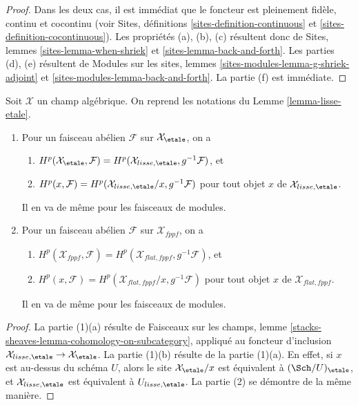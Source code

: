 \begin{proof}
Dans les deux cas, il est immédiat que le foncteur est pleinement fidèle,
continu et cocontinu (voir
Sites, définitions \ref{sites-definition-continuous} et
\ref{sites-definition-cocontinuous}).
Les propriétés (a), (b), (c) résultent donc de
Sites, lemmes \ref{sites-lemma-when-shriek} et
\ref{sites-lemma-back-and-forth}.
Les parties (d), (e) résultent de
Modules sur les sites, lemmes \ref{sites-modules-lemma-g-shriek-adjoint} et
\ref{sites-modules-lemma-back-and-forth}.
La partie (f) est immédiate.
\end{proof}

\begin{lemma}
\label{lemma-lisse-etale-cohomology}
Soit $\mathcal{X}$ un champ algébrique. On reprend les notations du
Lemme \ref{lemma-lisse-etale}.
\begin{enumerate}
\item Pour un faisceau abélien $\mathcal{F}$ sur $\mathcal{X}_\etale$, on a
\begin{enumerate}
\item $H^p(\mathcal{X}_\etale, \mathcal{F}) =
H^p(\mathcal{X}_{lisse,\etale}, g^{-1}\mathcal{F})$, et
\item $H^p(x, \mathcal{F}) =
H^p(\mathcal{X}_{lisse,\etale}/x, g^{-1}\mathcal{F})$
pour tout objet $x$ de $\mathcal{X}_{lisse,\etale}$.
\end{enumerate}
Il en va de même pour les faisceaux de modules.
\item Pour un faisceau abélien $\mathcal{F}$ sur $\mathcal{X}_{fppf}$, on a
\begin{enumerate}
\item $H^p(\mathcal{X}_{fppf}, \mathcal{F}) =
H^p(\mathcal{X}_{flat,fppf}, g^{-1}\mathcal{F})$, et
\item $H^p(x, \mathcal{F}) =
H^p(\mathcal{X}_{flat,fppf}/x, g^{-1}\mathcal{F})$
pour tout objet $x$ de $\mathcal{X}_{flat,fppf}$.
\end{enumerate}
Il en va de même pour les faisceaux de modules.
\end{enumerate}
\end{lemma}

\begin{proof}
La partie (1)(a) résulte de Faisceaux sur les champs, lemme
\ref{stacks-sheaves-lemma-cohomology-on-subcategory}, appliqué au foncteur
d'inclusion $\mathcal{X}_{lisse,\etale} \to \mathcal{X}_\etale$.
La partie (1)(b) résulte de la partie (1)(a). En effet, si $x$ est au-dessus du
schéma $U$, alors le site $\mathcal{X}_\etale/x$ est équivalent
à $(\Sch/U)_\etale$, et $\mathcal{X}_{lisse,\etale}$ est équivalent
à $U_{lisse,\etale}$. La partie (2) se démontre de la même manière.
\end{proof}

